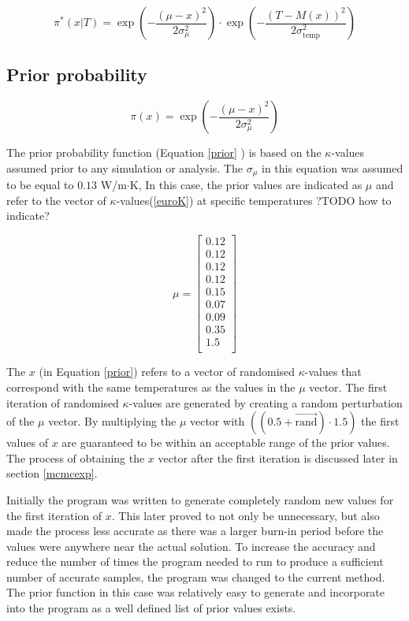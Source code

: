 \begin{equation}
\label{modbayes}
\pi^* (x|T) = \exp\left(-\frac{(\mu - x)^2}{2\sigma_{\mu}^2}\right) \cdot \exp\left(-\frac{\left(T-M(x)\right)^2}{2\sigma_{\text{temp}}^2}\right)
\end{equation}

	\subsection{Prior probability}
	
	\begin{equation}
	\label{prior}
	\pi(x) = \exp\left(-\frac{(\mu - x)^2}{2\sigma_{\mu}^2}\right)
	\end{equation}

	The prior probability function (Equation \ref{prior} ) is based on the $\kappa$-values assumed prior to any simulation or analysis. 
	The $\sigma_{\mu}$ in this equation was assumed to be equal to $0.13$ W/m$\cdot$K,
	In this case, the prior values are indicated as $\mu$ and refer to the vector of $\kappa$-values(\ref{euroK}) at specific temperatures ?TODO how to indicate?
	
	\begin{equation}
	\label{euroK}
	\mu =
		\begin{bmatrix}
		0.12\\ 
		0.12\\ 
		0.12\\ 
		0.12\\ 
		0.15\\ 
		0.07\\
		0.09\\ 
		0.35\\ 
		1.5\\
		\end{bmatrix}
	\end{equation}
	
The $x$ (in Equation \ref{prior}) refers to a vector of randomised $\kappa$-values that correspond with the same temperatures as the values in the $\mu$ vector.
The first iteration of randomised $\kappa$-values are generated by creating a random perturbation of the $\mu$ vector.
By multiplying the $\mu$ vector with $((0.5+\vec{\text{rand}})\cdot1.5)$ the first values of $x$ are guaranteed to be within an acceptable range of the prior values.
The process of obtaining the $x$ vector after the first iteration is discussed later in section \ref{mcmcexp}.


Initially the program was written to generate completely random new values for the first iteration of $x$. 
This later proved to not only be unnecessary, but also made the process less accurate as there was a larger burn-in period before the values were anywhere near the actual solution.
To increase the accuracy and reduce the number of times the program needed to run to produce a sufficient number of accurate samples, the program was changed to the current method.
The prior function in this case was relatively easy to generate and incorporate into the program as a well defined list of prior values exists.

